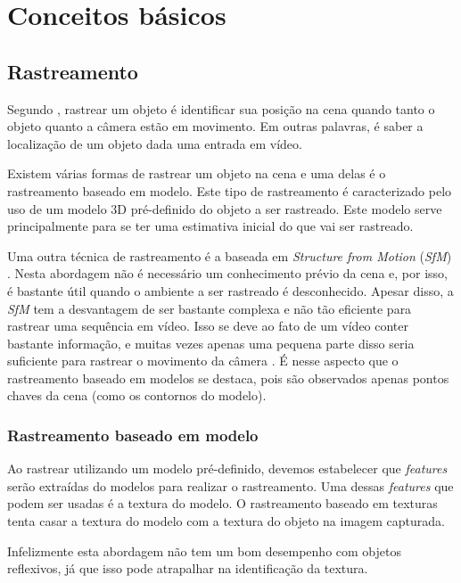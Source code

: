 \chapter{Conceitos básicos}

\section{Rastreamento}

Segundo \cite{lepetit}, rastrear um objeto é identificar sua posição na cena quando tanto o objeto quanto a câmera estão em movimento. Em outras palavras, é saber a localização de um objeto dada uma entrada em vídeo.

Existem várias formas de rastrear um objeto na cena \cite{teichrieb2007survey} e uma delas é o rastreamento baseado em modelo. Este tipo de rastreamento é caracterizado pelo uso de um modelo 3D pré-definido do objeto a ser rastreado. Este modelo serve principalmente para se ter uma estimativa inicial do que vai ser rastreado.

Uma outra técnica de rastreamento é a baseada em \emph{Structure from Motion} (\emph{SfM}) \cite{teichrieb2007survey}. Nesta abordagem não é necessário um conhecimento prévio da cena e, por isso, é bastante útil quando o ambiente a ser rastreado é desconhecido. Apesar disso, a \emph{SfM} tem a desvantagem de ser bastante complexa e não tão eficiente para rastrear uma sequência em vídeo. Isso se deve ao fato de um vídeo conter bastante informação, e muitas vezes apenas uma pequena parte disso seria suficiente para rastrear o movimento da câmera \cite{drummondecipolla}. É nesse aspecto que o rastreamento baseado em modelos se destaca, pois são observados apenas pontos chaves da cena (como os contornos do modelo).

\subsection{Rastreamento baseado em modelo}

Ao rastrear utilizando um modelo pré-definido, devemos estabelecer que \emph{features} serão extraídas do modelos para realizar o rastreamento. Uma dessas \emph{features} que podem ser usadas é a textura do modelo. O rastreamento baseado em texturas tenta casar a textura do modelo com a textura do objeto na imagem capturada. %

Infelizmente esta abordagem não tem um bom desempenho com objetos reflexivos, já que isso pode atrapalhar na identificação da textura.%

